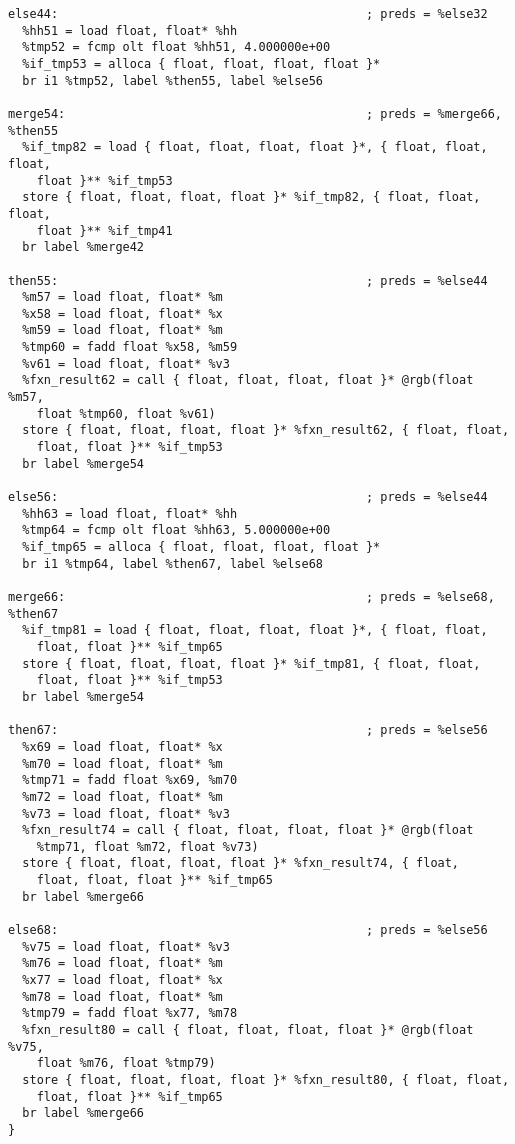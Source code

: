 \documentclass[main.tex]{subfiles}
\begin{document}
{\begin{lstlisting}
else44:                                           ; preds = %else32
  %hh51 = load float, float* %hh
  %tmp52 = fcmp olt float %hh51, 4.000000e+00
  %if_tmp53 = alloca { float, float, float, float }*
  br i1 %tmp52, label %then55, label %else56

merge54:                                          ; preds = %merge66, %then55
  %if_tmp82 = load { float, float, float, float }*, { float, float, float,
    float }** %if_tmp53
  store { float, float, float, float }* %if_tmp82, { float, float, float,
    float }** %if_tmp41
  br label %merge42

then55:                                           ; preds = %else44
  %m57 = load float, float* %m
  %x58 = load float, float* %x
  %m59 = load float, float* %m
  %tmp60 = fadd float %x58, %m59
  %v61 = load float, float* %v3
  %fxn_result62 = call { float, float, float, float }* @rgb(float %m57,
    float %tmp60, float %v61)
  store { float, float, float, float }* %fxn_result62, { float, float,
    float, float }** %if_tmp53
  br label %merge54

else56:                                           ; preds = %else44
  %hh63 = load float, float* %hh
  %tmp64 = fcmp olt float %hh63, 5.000000e+00
  %if_tmp65 = alloca { float, float, float, float }*
  br i1 %tmp64, label %then67, label %else68

merge66:                                          ; preds = %else68, %then67
  %if_tmp81 = load { float, float, float, float }*, { float, float,
    float, float }** %if_tmp65
  store { float, float, float, float }* %if_tmp81, { float, float,
    float, float }** %if_tmp53
  br label %merge54

then67:                                           ; preds = %else56
  %x69 = load float, float* %x
  %m70 = load float, float* %m
  %tmp71 = fadd float %x69, %m70
  %m72 = load float, float* %m
  %v73 = load float, float* %v3
  %fxn_result74 = call { float, float, float, float }* @rgb(float
    %tmp71, float %m72, float %v73)
  store { float, float, float, float }* %fxn_result74, { float, 
    float, float, float }** %if_tmp65
  br label %merge66

else68:                                           ; preds = %else56
  %v75 = load float, float* %v3
  %m76 = load float, float* %m
  %x77 = load float, float* %x
  %m78 = load float, float* %m
  %tmp79 = fadd float %x77, %m78
  %fxn_result80 = call { float, float, float, float }* @rgb(float %v75,
    float %m76, float %tmp79)
  store { float, float, float, float }* %fxn_result80, { float, float,
    float, float }** %if_tmp65
  br label %merge66
}


\end{lstlisting}}
\end{document}

